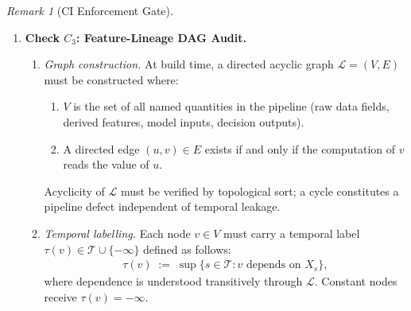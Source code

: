 \documentclass[12pt,openany]{book}
\numberwithin{equation}{chapter}
\theoremstyle{plain}
\theoremstyle{definition}
\theoremstyle{remark}
\newtheorem{remark}[theorem]{Remark}
\numberwithin{equation}{chapter}
\theoremstyle{plain}
\begin{document}
\begin{remark}[CI Enforcement Gate]
\begin{enumerate}
\begin{enumerate}
    \item \emph{Pass/fail criterion.}
          \begin{align}
            C_{2} \;:=\;
            \bigwedge_{j=1}^{p}
            \bigl[\,b_{j}(t) \leq t\,\bigr].
            \label{eq:c2-def}
          \end{align}
          Any $R_{j}$ with $b_{j}(t) > t$ must be reported
          in the audit log with the statistic identifier,
          the offending window boundary, and the bar index
          at which the violation was detected.

  \end{enumerate}

  \item \textbf{Check $C_{3}$: Feature-Lineage DAG Audit.}
  \label{ci:dag}

  \begin{enumerate}

    \item \emph{Graph construction.}
          At build time, a directed acyclic graph
          $\mathcal{L} = (V, E)$ must be constructed where:
          \begin{enumerate}
            \item $V$ is the set of all named quantities
                  in the pipeline (raw data fields, derived
                  features, model inputs, decision outputs).
            \item A directed edge $(u, v) \in E$ exists if
                  and only if the computation of $v$ reads
                  the value of $u$.
          \end{enumerate}
          Acyclicity of $\mathcal{L}$ must be verified by
          topological sort; a cycle constitutes a pipeline
          defect independent of temporal leakage.

    \item \emph{Temporal labelling.}
          Each node $v \in V$ must carry a temporal label
          $\tau(v) \in \mathcal{T} \cup \{-\infty\}$
          defined as follows:
          \begin{align}
            \tau(v) \;:=\;
            \sup\bigl\{s \in \mathcal{T} :
            v \text{ depends on } X_{s}\bigr\},
            \label{eq:node-label}
          \end{align}
          where dependence is understood transitively through
          $\mathcal{L}$.  Constant nodes receive
          $\tau(v) = -\infty$.


\end{enumerate}
\end{enumerate}
\end{remark}
\end{document}
